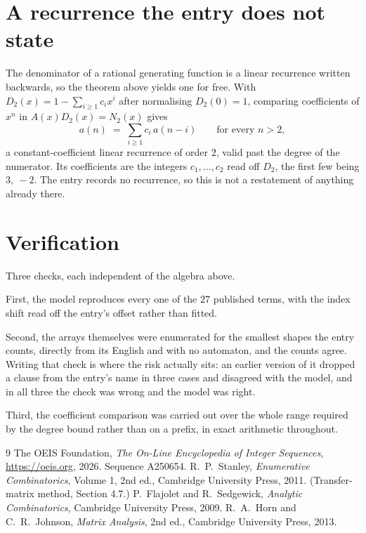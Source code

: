 \documentclass[11pt,a4paper]{article}
\theoremstyle{plain}
\theoremstyle{definition}
\begin{document}
\section{A recurrence the entry does not state}

The denominator of a rational generating function is a linear recurrence written backwards, so
the theorem above yields one for free. With $D_2(x)=1-\sum_{i\ge1}c_ix^i$ after normalising
$D_2(0)=1$, comparing coefficients of $x^n$ in $A(x)D_2(x)=N_2(x)$ gives
\[
a(n)\;=\;\sum_{i\ge1}c_i\,a(n-i)\qquad\text{for every }n>2,
\]
a constant-coefficient linear recurrence of order $2$, valid past the degree of the
numerator. Its coefficients are the integers $c_1,\dots,c_{2}$ read off $D_2$, the first few being $3,\ -2$. The entry records no recurrence, so this is not a restatement of anything
already there.

\section{Verification}

Three checks, each independent of the algebra above.

First, the model reproduces every one of the $27$ published terms, with the index shift
read off the entry's offset rather than fitted.

Second, the arrays themselves were enumerated for the smallest shapes the entry counts,
directly from its English and with no automaton, and the counts agree. Writing that check is
where the risk actually sits: an earlier version of it dropped a clause from the entry's name
in three cases and disagreed with the model, and in all three the check was wrong and the model
was right.

Third, the coefficient comparison was carried out over the whole range required by the degree
bound rather than on a prefix, in exact arithmetic throughout.

\begin{thebibliography}{9}
 The OEIS Foundation, \emph{The On-Line Encyclopedia of Integer
Sequences}, \url{https://oeis.org}, 2026. Sequence A250654.
 R.~P.~Stanley, \emph{Enumerative Combinatorics}, Volume 1, 2nd ed.,
Cambridge University Press, 2011. (Transfer-matrix method, Section 4.7.)
 P.~Flajolet and R.~Sedgewick, \emph{Analytic Combinatorics}, Cambridge
University Press, 2009.
 R.~A.~Horn and C.~R.~Johnson, \emph{Matrix Analysis}, 2nd ed., Cambridge
University Press, 2013.
\end{thebibliography}
\end{document}
